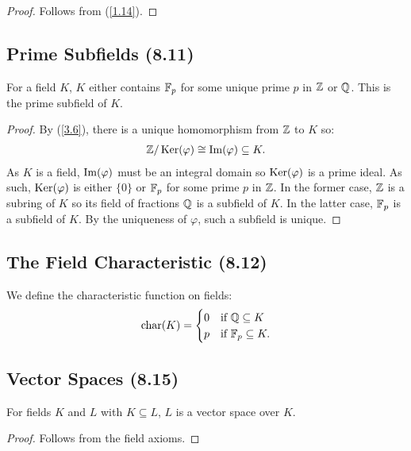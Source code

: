 \begin{proof}
    Follows from (\ref{1.14}).
\end{proof}

\subsection{Prime Subfields (8.11)} \label{8.11}

For a field $K$, $K$ either contains $\mathbb{F}_p$ for some unique prime $p$ in $\mathbb{Z}$
or $\mathbb{Q}$. This is the prime subfield of $K$.

\begin{proof}
    By (\ref{3.6}), there is a unique homomorphism from $\mathbb{Z}$ to $K$ so: \begin{align*}
        \mathbb{Z}/\operatorname{Ker}(\varphi) \cong \operatorname{Im}(\varphi) \subseteq K.
    \end{align*} As $K$ is a field, $\operatorname{Im}(\varphi)$ must be an integral domain so
    $\operatorname{Ker}(\varphi)$ is a prime ideal. As such, $\operatorname{Ker}(\varphi)$ is either $\{0\}$ or
    $\mathbb{F}_p$ for some prime $p$ in $\mathbb{Z}$. In the former case, $\mathbb{Z}$ is a
    subring of $K$ so its field of fractions $\mathbb{Q}$ is a subfield of $K$.
    In the latter case, $\mathbb{F}_p$ is a subfield of $K$. By the uniqueness of $\varphi$,
    such a subfield is unique.
\end{proof}

\subsection{The Field Characteristic (8.12)} \label{8.12}

We define the characteristic function on fields: \begin{align*}
    \operatorname{char}(K) = \begin{cases}
        0 & \text{if } \mathbb{Q} \subseteq K \\
        p & \text{if } \mathbb{F}_p \subseteq K.
    \end{cases}
\end{align*}

\subsection{Vector Spaces (8.15)} \label{8.15}

For fields $K$ and $L$ with $K \subseteq L$, $L$ is a vector space
over $K$.

\begin{proof}
    Follows from the field axioms.
\end{proof}

